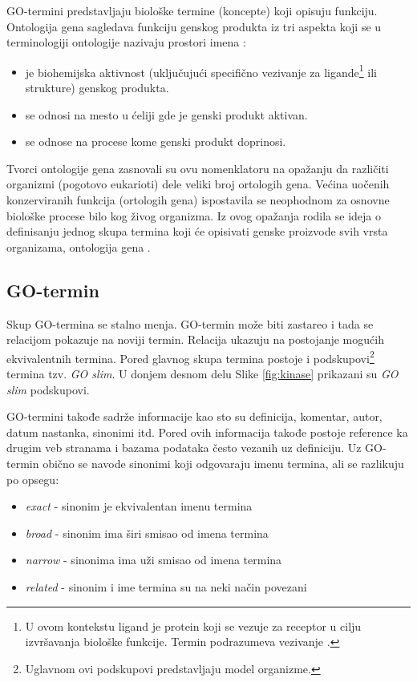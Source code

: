 GO-termini predstavljaju biološke
termine (koncepte) koji opisuju funkciju. Ontologija gena sagledava funkciju
genskog produkta iz tri aspekta koji se u terminologiji ontologije nazivaju
prostori imena :
\begin{itemize}
  \item {} je biohemijska aktivnost (uključujući
    specifično vezivanje za ligande\footnote{
      U ovom kontekstu ligand je protein koji se vezuje za receptor u cilju
      izvršavanja biološke funkcije. Termin podrazumeva vezivanje .
    } ili strukture) genskog produkta.
  \item {} se odnosi na mesto u ćeliji gde je
    genski produkt aktivan.
  \item {} se odnose na procese kome genski produkt
    doprinosi.
\end{itemize}

Tvorci ontologije gena zasnovali su ovu nomenklatoru na opažanju da različiti
organizmi (pogotovo eukarioti) dele veliki broj ortologih gena. Većina uočenih
konzerviranih funkcija (ortologih gena) ispostavila se neophodnom za osnovne
biološke procese bilo kog živog organizma.  Iz ovog opažanja rodila se ideja o
definisanju jednog skupa termina koji će opisivati genske proizvode svih vrsta
organizama, ontologija gena \parencite{GO2000}.


\subsection{GO-termin}

Skup GO-termina se stalno menja. GO-termin može biti zastareo i tada se
relacijom  pokazuje na noviji termin. Relacija
 ukazuju na postojanje mogućih ekvivalentnih termina. Pored
glavnog skupa termina postoje i podskupovi\footnote{Uglavnom ovi podskupovi
predstavljaju model organizme.} termina tzv. \textit{GO slim}. U donjem desnom
delu Slike \ref{fig:kinase} prikazani su \textit{GO slim} podskupovi.

GO-termini takođe sadrže informacije kao sto su definicija, komentar, autor, datum
nastanka, sinonimi itd. Pored ovih informacija takođe postoje reference ka
drugim veb stranama i bazama podataka često vezanih uz definiciju.  Uz GO-termin
obično se navode sinonimi koji odgovaraju imenu termina, ali se razlikuju po
opsegu:
\begin{itemize}
  \item \textit{exact} - sinonim je ekvivalentan imenu termina
  \item \textit{broad} - sinonim ima širi smisao od imena termina
  \item \textit{narrow} - sinonima ima uži smisao od imena termina
  \item \textit{related} - sinonim i ime termina su na neki način povezani
\end{itemize}

